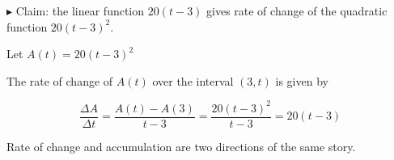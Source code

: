 \documentclass{ximera}
\begin{document}
$\blacktriangleright$ Claim: the linear function $20(t-3)$ gives rate of change of the quadratic function $20(t-3)^2$.





Let $A(t) = 20 (t-3)^2$


The rate of change of $A(t)$ over the interval $(3, t)$ is given by




\[
\frac{\Delta A}{\Delta t} = \frac{A(t) - A(3)}{t-3} = \frac{20 (t-3)^2}{t-3} = 20(t-3)
\]











Rate of change and accumulation are two directions of the same story.
\end{document}
